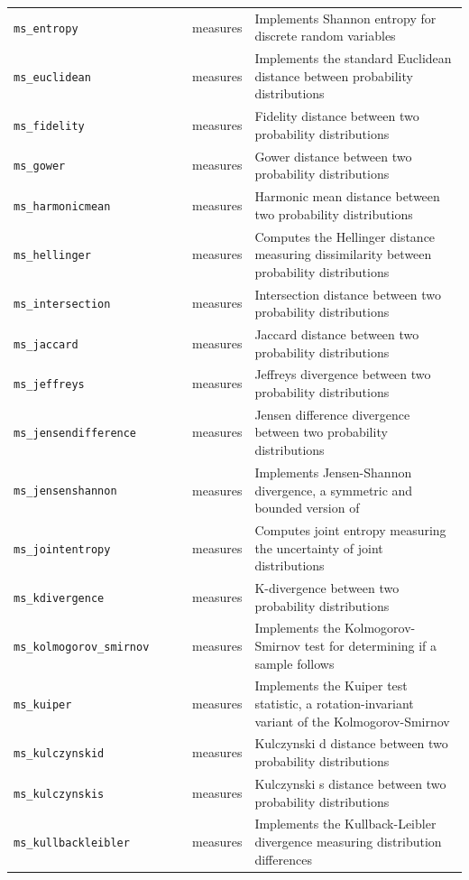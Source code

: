 \begin{footnotesize}
\begin{longtable}{|p{0.4\linewidth}|p{0.1\linewidth}|p{0.5\linewidth}|}
\texttt{ms\_entropy} & measures & Implements Shannon entropy for discrete random variables\\
\texttt{ms\_euclidean} & measures & Implements the standard Euclidean distance between probability distributions\\
\texttt{ms\_fidelity} & measures & Fidelity distance between two probability distributions\\
\texttt{ms\_gower} & measures & Gower distance between two probability distributions\\
\texttt{ms\_harmonicmean} & measures & Harmonic mean distance between two probability distributions\\
\texttt{ms\_hellinger} & measures & Computes the Hellinger distance measuring dissimilarity between probability distributions\\
\texttt{ms\_intersection} & measures & Intersection distance between two probability distributions\\
\texttt{ms\_jaccard} & measures & Jaccard distance between two probability distributions\\
\texttt{ms\_jeffreys} & measures & Jeffreys divergence between two probability distributions\\
\texttt{ms\_jensendifference} & measures & Jensen difference divergence between two probability distributions\\
\texttt{ms\_jensenshannon} & measures & Implements Jensen-Shannon divergence, a symmetric and bounded version of\\
\texttt{ms\_jointentropy} & measures & Computes joint entropy measuring the uncertainty of joint distributions\\
\texttt{ms\_kdivergence} & measures & K-divergence between two probability distributions\\
\texttt{ms\_kolmogorov\_smirnov} & measures & Implements the Kolmogorov-Smirnov test for determining if a sample follows\\
\texttt{ms\_kuiper} & measures & Implements the Kuiper test statistic, a rotation-invariant variant of the Kolmogorov-Smirnov\\
\texttt{ms\_kulczynskid} & measures & Kulczynski d distance between two probability distributions\\
\texttt{ms\_kulczynskis} & measures & Kulczynski s distance between two probability distributions\\
\texttt{ms\_kullbackleibler} & measures & Implements the Kullback-Leibler divergence measuring distribution differences\\

\end{longtable}
\end{footnotesize}
